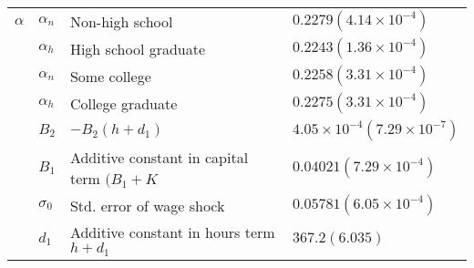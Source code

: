\documentclass[10pt, letterpaper]{article}
\begin{document}
\begin{center}
\begin{table}
{\begin{tabularx}{1.5\textwidth}{c l l l}
    $\alpha$ &   $\alpha_n $ &   Non-high school  &  $ 0.2279 (4.14 \times 10^{-4})$\\
    {} &   $ \alpha_h $&  High school graduate  &  $0.2243 (1.36  \times 10^{-4}) $\\
    {} &   $ \alpha_n$ &  Some college  & $ 0.2258 (3.31  \times 10^{-4})$ \\
    {} &   $\alpha_h $&  College graduate  &  $ 0.2275 (3.31  \times 10^{-4})$\\
    {} &   $B_2$ &  $-B_2(h+d_1)$  &  $4.05  \times 10^{-4} (7.29  \times 10^{-7}) $\\
    {} &   $B_1$  & Additive constant in capital term $(B_1+K$   &  $ 0.04021 (7.29  \times 10^{-4})$\\
    {} &   $\sigma_0$ &  Std. error of wage shock  &  $0.05781 (6.05  \times 10^{-4}) $\\
    {} &   $d_1$  &  Additive constant in hours term $h+d_1$  &  $367.2 (6.035) $\\


\end{tabularx}}
\end{table}
\end{center}
\end{document}
